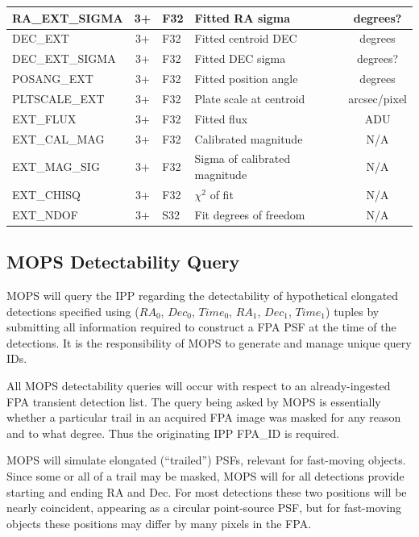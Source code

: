 \documentclass[panstarrs,spec]{panstarrs}
\begin{document}
\begin{center}
\begin{longtable}{|lclp{3.5in}c|}
    \hline
    RA\_EXT\_SIGMA & 3+ & F32 & Fitted RA sigma & degrees? \\
    \hline
    DEC\_EXT & 3+ & F32 & Fitted centroid DEC & degrees \\
    \hline
    DEC\_EXT\_SIGMA & 3+ & F32 & Fitted DEC sigma & degrees? \\
    \hline
    POSANG\_EXT & 3+ & F32 & Fitted position angle & degrees \\
    \hline
    PLTSCALE\_EXT & 3+ & F32 & Plate scale at centroid & arcsec/pixel \\
    \hline
    EXT\_FLUX & 3+ & F32 & Fitted flux & ADU \\
    \hline
    EXT\_CAL\_MAG & 3+ & F32 & Calibrated magnitude & N/A \\
    \hline
    EXT\_MAG\_SIG & 3+ & F32 & Sigma of calibrated magnitude & N/A \\
    \hline
    EXT\_CHISQ & 3+ & F32 & $\chi^2$ of fit & N/A \\
    \hline
    EXT\_NDOF & 3+ & S32 & Fit degrees of freedom & N/A \\
    \hline
  \end{longtable}
\end{center}

\subsection{MOPS Detectability Query}

MOPS will query the IPP regarding the detectability of hypothetical
elongated detections specified using ($RA_0$, $Dec_0$, $Time_0$,
$RA_1$, $Dec_1$, $Time_1$) tuples by submitting all information
required to construct a FPA PSF at the time of the detections.  It is
the responsibility of MOPS to generate and manage unique query IDs.

All MOPS detectability queries will occur with respect to an already-ingested
FPA transient detection list.  The query being asked by MOPS is essentially
whether a particular trail in an acquired FPA image was masked for any
reason and to what degree.  Thus the originating IPP FPA\_ID is required.

MOPS will simulate elongated (``trailed'') PSFs, relevant for
fast-moving objects.  Since some or all of a trail may be masked, MOPS
will for all detections provide starting and ending RA and Dec.  For
most detections these two positions will be nearly coincident,
appearing as a circular point-source PSF, but for fast-moving objects
these positions may differ by many pixels in the FPA.
\end{document}
